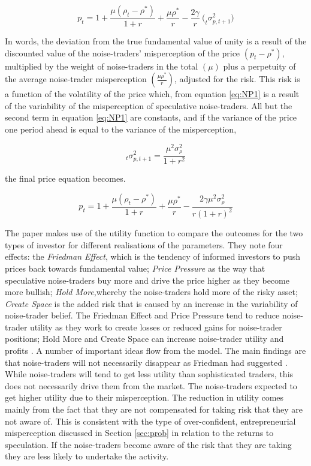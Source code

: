 \documentclass[12pt, a4paper, oneside]{article} %
\begin{document}
\begin{equation}
p_t = 1 + \frac{\mu(\rho_t - \rho^*)}{1 + r} + \frac{ \mu \rho^*}{r} - \frac{2 \gamma}{r}\ \big (_t\sigma^2_{p,t+1} \big )
\label{eq:NP1}
\end{equation} 

In words, the deviation from the true fundamental value of unity is a result of the discounted value of the noise-traders' misperception of the price $(p_t - \rho^*)$, multiplied by the weight of noise-traders in the total $(\mu)$ plus a perpetuity of the average noise-trader misperception $(\frac{ \mu \rho^*}{r} )$, adjusted for the risk.   This risk is a function of the volatility of the price which,  from equation \ref{eq:NP1} is a result of the variability of the misperception of speculative noise-traders.   All but the second term in equation \ref{eq:NP1} are constants, and if the variance of the price one period ahead  is equal to the variance of the misperception, 

\begin{equation} 
 _t\sigma^2_{p,t+1} = \frac{\mu^2 \sigma_{\rho}^2}{1+r^2}  
\end{equation}

the final price equation becomes.

\begin{equation}
p_t = 1 + \frac{\mu(\rho_t - \rho^*)}{1 + r} + \frac{ \mu \rho^*}{r} - \frac{2 \gamma \mu^2 \sigma_{\rho}^2}{r(1 + r)^2}
\label{eq:NP2}
\end{equation} 

The paper makes use of the utility function to compare the outcomes for the two types of investor for different realisations of the parameters.  They note four effects:  the \emph{Friedman Effect}, which is the tendency of informed investors to push prices back towards fundamental value; \emph{Price Pressure} as the way that speculative noise-traders buy more and drive the price higher as they become more bullish; \emph{Hold More},whereby the noise-traders hold more of the risky asset; \emph{Create Space} is the added risk that is caused by an increase in the variability of noise-trader belief.  The Friedman Effect and Price Pressure tend to reduce noise-trader utility as they work to create losses or reduced gains for noise-trader positions; Hold More and Create Space can increase noise-trader utility and profits \citep[pp. 14-15]{Delong1990noise}. 
A number of important ideas flow from the model.  The main findings are that noise-traders will not necessarily disappear as Friedman had suggested \citep{FriedmanPositive}.  While noise-traders will tend to get less utility than sophisticated traders, this does not necessarily drive them from the market.  The noise-traders expected to get higher utility due to their misperception.  The reduction in utility comes mainly from the fact that they are not compensated for taking risk that they are not aware of.  This is consistent with the type of over-confident, entrepreneurial misperception discussed in Section \ref{sec:prob} in relation to the returns to speculation.  If the noise-traders become aware of the risk that they are taking they are less likely to undertake the activity. 
\end{document}
